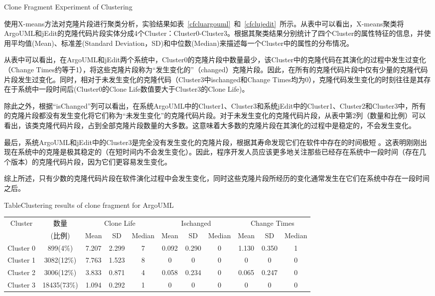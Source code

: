 {Clone Fragment Experiment of Clustering}

使用X-means方法对克隆片段进行聚类分析，实验结果如表~\ref{cfcluargouml}~和~\ref{cfclujedit}~所示。从表中可以看出，X-means聚类将ArgoUML和jEdit的克隆代码片段实体分成4个Cluster：Cluster0-Cluster3。根据其聚类结果分别统计了四个Cluster的属性特征的信息，并使用平均值(Mean)、标准差(Standard Deviation，SD)和中位数(Median)来描述每一个Cluster中的属性的分布情况。

从表中可以看出，在ArgoUML和jEdit两个系统中，Cluster0的克隆片段中数量最少，该Cluster中的克隆代码在其演化的过程中发生过变化（Change Times约等于1），将这些克隆片段称为“发生变化的”（changed）克隆片段。因此，在所有的克隆代码片段中仅有少量的克隆代码片段发生过变化。同时，相对于未发生变化的克隆代码（Cluster3中ischanged和Change Times均为0），克隆代码发生变化的时刻往往是其存在于系统中一段时间后(Cluster0的Clone Life数值要大于Cluster3的Clone Life)。

除此之外，根据“isChanged”列可以看出，在系统ArgoUML中的Cluster1、Cluster3和系统jEdit中的Cluster1、Cluster2和Cluster3中，所有的克隆片段都没有发生变化将它们称为“未发生变化”的克隆代码片段。对于未发生变化的克隆代码片段，从表中第2列（数量和比例）可以看出，该类克隆代码片段，占到全部克隆片段数量的大多数。这意味着大多数的克隆片段在其演化的过程中是稳定的，不会发生变化。

最后，系统ArgoUML和jEdit中的Cluster3是完全没有发生变化的克隆片段，根据其寿命发现它们在软件中存在的时间极短 。这表明刚刚出现在系统中的克隆是极其稳定的（在短时间内不会发生变化）。因此，程序开发人员应该更多地关注那些已经存在系统中一段时间（存在几个版本）的克隆代码片段，因为它们更容易发生变化。

综上所述，只有少数的克隆代码片段在软件演化过程中会发生变化，同时这些克隆片段所经历的变化通常发生在它们在系统中存在一段时间之后。

\begin{table}[htbp]
{Table$\!$}{Clustering results of clone fragment for ArgoUML}
\vspace{0.5em}
\centering
\footnotesize
\begin{tabular}{ccccccccccc}
\toprule[1.5pt]
\multirow{2}{*}{Cluster}&{数量}&\multicolumn{3}{c}{Clone Life}&\multicolumn{3}{c}{Ischanged}&\multicolumn{3}{c}{Change Times} \\
\cline{3-11}
&(比例)&{Mean}&SD &{Median}&{Mean}&SD &{Median}&{Mean}&SD &{Median}\\
\midrule[1pt]
Cluster 0&899(4\%)&7.207&2.299&7&0.092&0.290&0&1.130&0.350&1\\ 
Cluster 1&3082(12\%)&7.763&1.523&8&0&0&0	&0&0&0\\ 
Cluster 2&3006(12\%)&3.833&0.871&4&0.058&0.234&0	&0.065&0.247&0\\ 
Cluster 3&18435(73\%)&1.094&0.292&1	&0	&0	&0	&0	&0	&0\\ 
\bottomrule[1.5pt]
\end{tabular}
\end{table}

